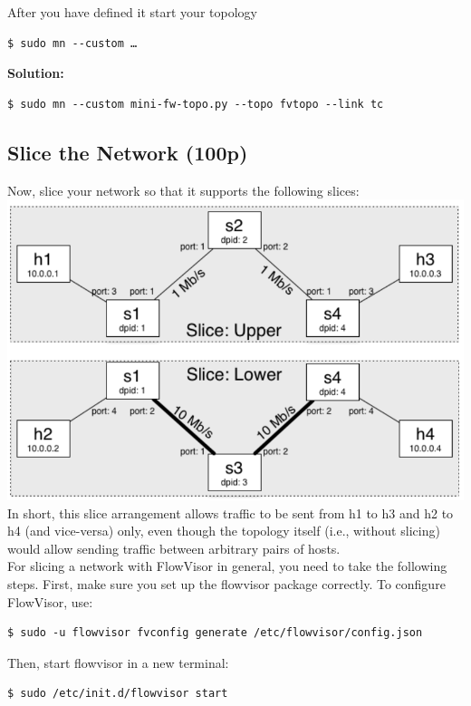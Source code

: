 \documentclass{llncs}
\begin{document}
After you have defined it start your topology
\begin{lstlisting}
$ sudo mn --custom …
\end{lstlisting}

\textbf{Solution:}
\begin{lstlisting}
$ sudo mn --custom mini-fw-topo.py --topo fvtopo --link tc
\end{lstlisting}

\subsection{Slice the Network (100p)}
Now, slice your network so that it supports the following slices:\\
\includegraphics[scale=0.55]{images/8-2.png} 
In short, this slice arrangement allows traffic to be sent from h1 to h3 and 
h2 to h4 (and vice-versa) only, even though the topology itself (i.e., 
without slicing) would allow sending traffic between arbitrary pairs of 
hosts.\\

For slicing a network with FlowVisor in general, you need to take the 
following steps. First, make sure you set up the flowvisor package 
correctly. To configure FlowVisor, use:

\begin{lstlisting}
$ sudo -u flowvisor fvconfig generate /etc/flowvisor/config.json
\end{lstlisting}

Then, start flowvisor in a new terminal:
\begin{lstlisting}
$ sudo /etc/init.d/flowvisor start
\end{lstlisting}
\end{document}
